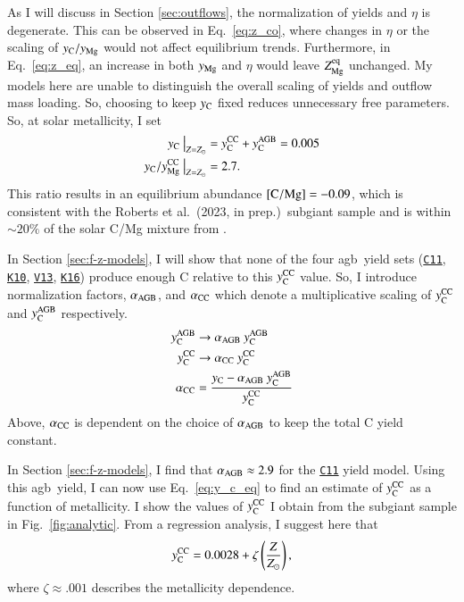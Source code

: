 \documentclass[12pt,oneside,letterpaper]{report}
\newcommand{\agb}{\gls{agb}}
\newcommand{\citetjack}{Roberts et al.~(2023, in prep.)}
\newcommand{\cxi}{\texttt{\hyperlink{C11}{C11}}}
\newcommand{\kx}{\texttt{\hyperlink{K10}{K10}}}
\newcommand{\kxvi}{\texttt{\hyperlink{K16}{K16}}}
\newcommand{\vxiii}{\texttt{\hyperlink{V13}{V13}}}
\newcommand{\Ycc}{\ensuremath{y_{\rm C}^{\rm CC}}}
\newcommand{\Yoc}{\ensuremath{y_{\rm Mg}^{\rm CC}}}
\newcommand{\Ycagb}{\ensuremath{y_{\rm C}^{\rm AGB}}}
\newcommand{\Yct}{\ensuremath{y_{\rm C}}}
\newcommand{\about}[1]{${\sim} #1$}
\begin{document}
As I will discuss in Section \ref{sec:outflows}, the normalization of yields and $\eta$ is degenerate. This can be observed in Eq.~\ref{eq:z_co}, where changes in $\eta$ or the scaling of $y_{\rm C}/y_{\rm Mg}$ would not affect equilibrium trends. Furthermore, in Eq.~\ref{eq:z_eq}, an increase in both $y_{\rm Mg}$ and $\eta$ would leave $Z_{\rm Mg}^{\rm eq}$ unchanged. My models here are unable to distinguish the overall scaling of yields and outflow mass loading. So, choosing to keep $y_{\rm C}$ fixed reduces unnecessary free parameters. So, at solar metallicity, I set
\begin{subequations}
    \begin{align}
        \Yct~\big\vert_{Z=Z_\odot} &= \Ycc + \Ycagb = 0.005 \\
        \Yct/\Yoc~\big\vert_{Z=Z_\odot} &= 2.7.
    \end{align}
\end{subequations}
This ratio results in an equilibrium abundance ${\rm [C/Mg]} = -0.09$, which is consistent with the \citetjack~\gls{subgiant} sample and is within \about{20\%} of the solar C/Mg mixture from \citet{asplund+09}.

In Section \ref{sec:f-z-models}, I will show that none of the four \agb\ yield sets (\cxi{}, \kx{}, \vxiii{}, \kxvi{}) produce enough C relative to this $\Ycc$ value. So, I introduce normalization factors, $\alpha_{\rm AGB}$, and $\alpha_{\rm CC}$ which denote a multiplicative scaling of $\Ycc$ and $\Ycagb$ respectively. 
\begin{subequations} \label{eq:alpha}
    \begin{align}
        \Ycagb &\rightarrow \alpha_{\rm AGB}\ \Ycagb \\
        \Ycc &\rightarrow \alpha_{\rm CC}\ \Ycc\\
        \alpha_{\rm CC} &= \frac{\Yct - \alpha_{\rm AGB}\ \Ycagb}{\Ycc}
    \end{align}
\end{subequations}
Above, $\alpha_{\rm CC}$ is dependent on the choice of $\alpha_{\rm AGB}$ to keep the total C yield constant. 

In Section \ref{sec:f-z-models}, I find that $\alpha_{\rm AGB}\approx 2.9$ for the \cxi{} yield model. Using this \agb\ yield, I can now use Eq.~\ref{eq:y_c_eq} to find an estimate of $\Ycc$ as a function of metallicity. I show the values of $\Ycc$ I obtain from the \gls{subgiant} sample in Fig.~\ref{fig:analytic}. From a regression analysis, I suggest here that
\begin{equation}\label{eq:zeta}
    \Ycc = 0.0028 + \zeta\left(\frac{Z}{Z_\odot}\right),
\end{equation}
where $\zeta\approx.001$ describes the metallicity dependence.
\end{document}

